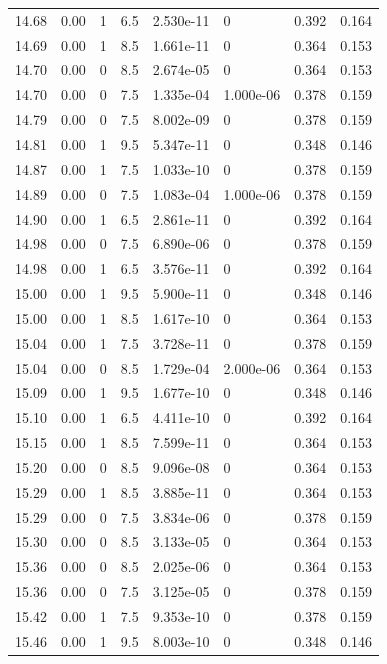 \documentclass[preview]{standalone}
\begin{document}
{{{{{{{{{{{\begin{tabular}{L{1.2cm}C{1.2cm} C{0.3cm}C{0.5cm} C{1.4cm}C{1.4cm} C{1.4cm}C{1.4cm}}
  14.68  &  0.00  & 1     & 6.5 &  2.530e-11  & 0  & 0.392 &  0.164   \\ 
  14.69  &  0.00  & 1     & 8.5 &  1.661e-11  & 0  & 0.364 &  0.153   \\ 
  14.70  &  0.00  & 0     & 8.5 &  2.674e-05  & 0  & 0.364 &  0.153   \\ 
  14.70  &  0.00  & 0     & 7.5 &  1.335e-04  & 1.000e-06  & 0.378 &  0.159   \\ 
  14.79  &  0.00  & 0     & 7.5 &  8.002e-09  & 0  & 0.378 &  0.159   \\ 
  14.81  &  0.00  & 1     & 9.5 &  5.347e-11  & 0  & 0.348 &  0.146   \\ 
  14.87  &  0.00  & 1     & 7.5 &  1.033e-10  & 0  & 0.378 &  0.159   \\ 
  14.89  &  0.00  & 0     & 7.5 &  1.083e-04  & 1.000e-06  & 0.378 &  0.159   \\ 
  14.90  &  0.00  & 1     & 6.5 &  2.861e-11  & 0  & 0.392 &  0.164   \\ 
  14.98  &  0.00  & 0     & 7.5 &  6.890e-06  & 0  & 0.378 &  0.159   \\ 
  14.98  &  0.00  & 1     & 6.5 &  3.576e-11  & 0  & 0.392 &  0.164   \\ 
  15.00  &  0.00  & 1     & 9.5 &  5.900e-11  & 0  & 0.348 &  0.146   \\ 
  15.00  &  0.00  & 1     & 8.5 &  1.617e-10  & 0  & 0.364 &  0.153   \\ 
  15.04  &  0.00  & 1     & 7.5 &  3.728e-11  & 0  & 0.378 &  0.159   \\ 
  15.04  &  0.00  & 0     & 8.5 &  1.729e-04  & 2.000e-06  & 0.364 &  0.153   \\ 
  15.09  &  0.00  & 1     & 9.5 &  1.677e-10  & 0  & 0.348 &  0.146   \\ 
  15.10  &  0.00  & 1     & 6.5 &  4.411e-10  & 0  & 0.392 &  0.164   \\ 
  15.15  &  0.00  & 1     & 8.5 &  7.599e-11  & 0  & 0.364 &  0.153   \\ 
  15.20  &  0.00  & 0     & 8.5 &  9.096e-08  & 0  & 0.364 &  0.153   \\ 
  15.29  &  0.00  & 1     & 8.5 &  3.885e-11  & 0  & 0.364 &  0.153   \\ 
  15.29  &  0.00  & 0     & 7.5 &  3.834e-06  & 0  & 0.378 &  0.159   \\ 
  15.30  &  0.00  & 0     & 8.5 &  3.133e-05  & 0  & 0.364 &  0.153   \\ 
  15.36  &  0.00  & 0     & 8.5 &  2.025e-06  & 0  & 0.364 &  0.153   \\ 
  15.36  &  0.00  & 0     & 7.5 &  3.125e-05  & 0  & 0.378 &  0.159   \\ 
  15.42  &  0.00  & 1     & 7.5 &  9.353e-10  & 0  & 0.378 &  0.159   \\ 
  15.46  &  0.00  & 1     & 9.5 &  8.003e-10  & 0  & 0.348 &  0.146   \\ 
\hline 
\end{tabular} 

}}}}}}}}}}}
\end{document}
